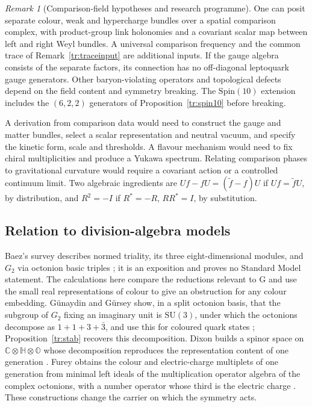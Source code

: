 \documentclass[aps,pra,onecolumn,superscriptaddress,nofootinbib,10pt]{revtex4-2}
\theoremstyle{definition}
\theoremstyle{remark}
\newtheorem{remark}[theorem]{Remark}
\newcommand{\SU}{\mathrm{SU}}
\begin{document}
\begin{remark}[Comparison-field hypotheses and research programme]\label{tr:programme}
One can posit separate colour, weak and hypercharge bundles over
a spatial comparison complex, with product-group link holonomies
and a covariant scalar map between left and right Weyl bundles.
A universal comparison frequency and the common trace of
Remark~\ref{tr:traceinput} are additional inputs.
If the gauge algebra consists of the separate factors, its
connection has no off-diagonal leptoquark gauge generators.
Other baryon-violating operators and topological defects depend
on the field content and symmetry breaking. The
\(\mathrm{Spin}(10)\) extension includes the \((6,2,2)\)
generators of Proposition~\ref{tr:spin10} before breaking.

A derivation from comparison data would need to construct the
gauge and matter bundles, select a scalar representation and
neutral vacuum, and specify the kinetic form, scale and thresholds.
A flavour mechanism would need to fix chiral multiplicities and
produce a Yukawa spectrum. Relating comparison phases to
gravitational curvature would require a covariant action or a
controlled continuum limit. Two algebraic ingredients are
\(Uf-fU=(\widetilde f-f)U\) if \(Uf=\widetilde fU\), by
distribution, and \(R^2=-I\) if \(R^*=-R\), \(RR^*=I\),
by substitution.
\end{remark}

\subsection{Relation to division-algebra models}\label{tr:literature}

Baez's survey describes normed triality, its three eight-dimensional
modules, and \(G_2\) via octonion basic triples
\cite[\S\S2.4, 4.1]{Baez}; it is an exposition and proves no Standard Model statement. The calculations here compare the
reductions relevant to G and use the small real representations
of colour to give an obstruction for any colour embedding.
G\"unaydin and G\"ursey show, in a split octonion basis, that the subgroup of $G_2$ fixing an imaginary unit
is $\SU(3)$, under which the octonions decompose as $1+1+3+\bar3$, and use this for coloured quark states
\cite{tr:GG}; Proposition~\ref{tr:stab} recovers this decomposition. Dixon builds a spinor space on
\(\mathbb C\otimes\mathbb H\otimes\mathbb O\) whose decomposition reproduces the representation content of one
generation \cite{tr:Dixon}.
Furey obtains the colour and electric-charge multiplets of one generation from
minimal left ideals of the multiplication operator algebra of
the complex octonions, with a number operator whose third is the electric charge
\cite{tr:FureyCharge}. These constructions change the carrier on
which the symmetry acts.
\end{document}
